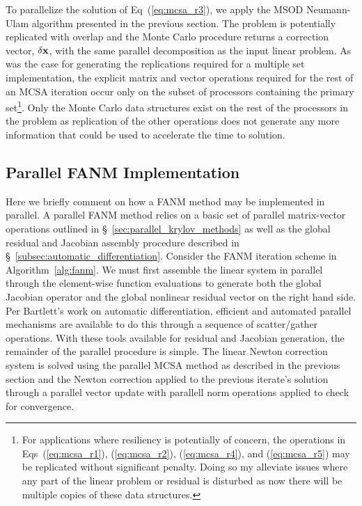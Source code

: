 To parallelize the solution of Eq~(\ref{eq:mcsa_r3}), we apply the
MSOD Neumann-Ulam algorithm presented in the previous section. The
problem is potentially replicated with overlap and the Monte Carlo
procedure returns a correction vector, $\delta \mathbf{x}$, with the same
parallel decomposition as the input linear problem. As was the case
for generating the replications required for a multiple set
implementation, the explicit matrix and vector operations required for
the rest of an MCSA iteration occur only on the subset of processors
containing the primary set\footnote{For applications where resiliency
  is potentially of concern, the operations in Eqs~(\ref{eq:mcsa_r1}),
  (\ref{eq:mcsa_r2}), (\ref{eq:mcsa_r4}), and (\ref{eq:mcsa_r5}) may
  be replicated without significant penalty. Doing so my alleviate
  issues where any part of the linear problem or residual is disturbed
  as now there will be multiple copies of these data
  structures.}. Only the Monte Carlo data structures exist on the rest
of the processors in the problem as replication of the other
operations does not generate any more information that could be used
to accelerate the time to solution.

\subsection{Parallel FANM Implementation}
\label{subsec:parallel_fanm}
Here we briefly comment on how a FANM method may be implemented in
parallel. A parallel FANM method relies on a basic set of parallel
matrix-vector operations outlined in
\S~\ref{sec:parallel_krylov_methods} as well as the global residual
and Jacobian assembly procedure described in
\S~\ref{subsec:automatic_differentiation}. Consider the FANM iteration
scheme in Algorithm~\ref{alg:fanm}. We must first assemble the linear
system in parallel through the element-wise function evaluations to
generate both the global Jacobian operator and the global nonlinear
residual vector on the right hand side. Per Bartlett's work on
automatic differentiation, efficient and automated parallel mechanisms
are available to do this through a sequence of scatter/gather
operations. With these tools available for residual and Jacobian
generation, the remainder of the parallel procedure is simple. The
linear Newton correction system is solved using the parallel MCSA
method as described in the previous section and the Newton correction
applied to the previous iterate's solution through a parallel vector
update with parallell norm operations applied to check for
convergence.

